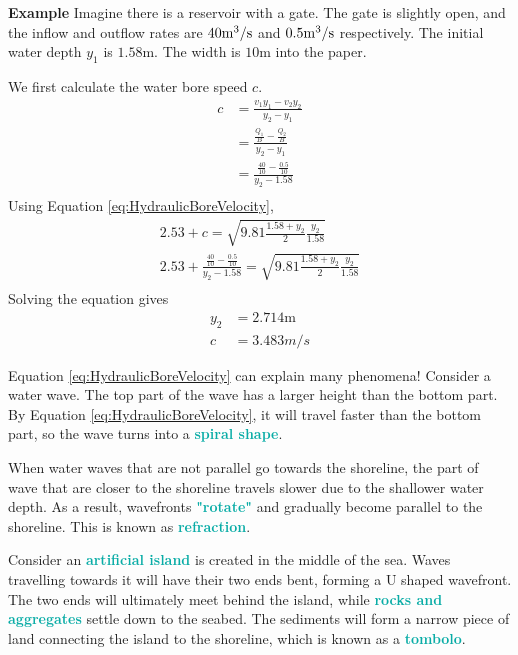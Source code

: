\documentclass[twoside]{article}
\newcommand{\example}[1]{\begin{examplebox} \emoji{croissant} \textbf{Example} \newline #1 \end{examplebox}}
\newcommand{\highlightbluetext}[1]{\textcolor[HTML]{09ACA6}{\textbf{#1}}}
\numberwithin{equation}{section}
\begin{document}
	\example{
		Imagine there is a reservoir with a gate. The gate is slightly open, and the inflow and outflow rates are $40 \unit{m\cubed/s}$ and $0.5 \unit{m\cubed/s}$ respectively. The initial water depth $y_1$ is $1.58 \unit{\metre}$. The width is $10 \unit{\metre}$ into the paper.
		
		We first calculate the water bore speed $c$.
		\begin{align*}
			c &= \frac{v_1y_1-v_2y_2}{y_2-y_1} \\
			&= \frac{\frac{Q_1}{B}-\frac{Q_2}{B}}{y_2-y_1} \\
			&= \frac{\frac{40}{10}-\frac{0.5}{10}}{y_2-1.58} \\
		\end{align*}
		Using Equation \ref{eq:HydraulicBoreVelocity},
		\begin{align*}
			2.53+c = \sqrt{9.81 \frac{1.58+y_2}{2} \frac{y_2}{1.58}} \\
			2.53+\frac{\frac{40}{10}-\frac{0.5}{10}}{y_2-1.58} = \sqrt{9.81 \frac{1.58+y_2}{2} \frac{y_2}{1.58}} \\
		\end{align*}
		Solving the equation gives
		\begin{align*}
			y_2 &= 2.714 \unit{\metre} \\
			c &= 3.483 \unit{m/s}
		\end{align*}
	}
	
	Equation \ref{eq:HydraulicBoreVelocity} can explain many phenomena!
	Consider a water wave. The top part of the wave has a larger height than the bottom part. By Equation \ref{eq:HydraulicBoreVelocity}, it will travel faster than the bottom part, so the wave turns into a \highlightbluetext{spiral shape}.
	
	When water waves that are not parallel go towards the shoreline, the part of wave that are closer to the shoreline travels slower due to the shallower water depth. As a result, wavefronts \highlightbluetext{"rotate"} and gradually become parallel to the shoreline. This is known as \highlightbluetext{refraction}.
	
	Consider an \highlightbluetext{artificial island} is created in the middle of the sea. Waves travelling towards it will have their two ends bent, forming a U shaped wavefront. The two ends will ultimately meet behind the island, while \highlightbluetext{rocks and aggregates} settle down to the seabed. The sediments will form a narrow piece of land connecting the island to the shoreline, which is known as a \highlightbluetext{tombolo}.
	
\end{document}
